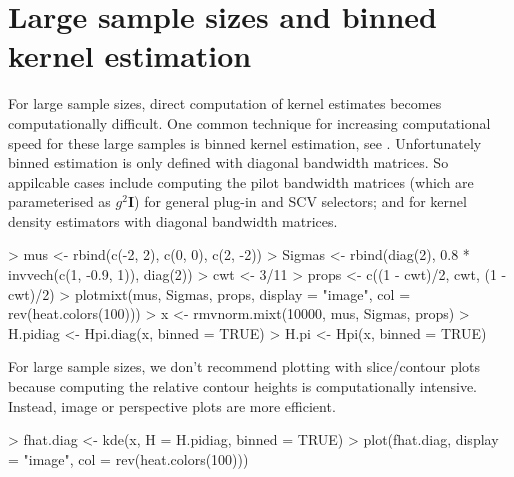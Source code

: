 \documentclass[a4paper,11pt]{article}
\newcommand{\mat}[1]{\mathbf{#1}}
\begin{document}
\section{Large sample sizes and binned kernel estimation}
\label{sec:binned}

For large sample sizes, direct computation of kernel estimates becomes 
computationally difficult. One common technique for increasing computational
speed for these large samples is binned kernel estimation, 
see \citet*[Appendix~D]{wand94}. Unfortunately binned estimation is only defined 
with diagonal bandwidth matrices. So appilcable cases include 
computing the pilot bandwidth matrices
(which are parameterised as $g^2 \mat{I}$) for general plug-in and SCV selectors;
and for kernel density estimators with diagonal bandwidth matrices. 


\begin{Schunk}
\begin{Sinput}
> mus <- rbind(c(-2, 2), c(0, 0), c(2, -2))
> Sigmas <- rbind(diag(2), 0.8 * invvech(c(1, -0.9, 1)), diag(2))
> cwt <- 3/11
> props <- c((1 - cwt)/2, cwt, (1 - cwt)/2)
> plotmixt(mus, Sigmas, props, display = "image", col = rev(heat.colors(100)))
> x <- rmvnorm.mixt(10000, mus, Sigmas, props)
> H.pidiag <- Hpi.diag(x, binned = TRUE)
> H.pi <- Hpi(x, binned = TRUE)
\end{Sinput}
\end{Schunk}
For large sample sizes, we don't recommend plotting with slice/contour plots
because computing the relative contour heights is computationally intensive.
Instead, image or perspective plots are more efficient.
\begin{Schunk}
\begin{Sinput}
> fhat.diag <- kde(x, H = H.pidiag, binned = TRUE)
> plot(fhat.diag, display = "image", col = rev(heat.colors(100)))
\end{Sinput}
\end{Schunk}
\end{document}
